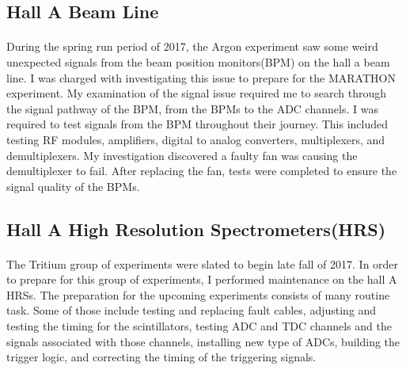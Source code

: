 \documentclass[12pt,letterpaper]{article}
\begin{document}
 \subsection*{Hall A Beam Line}
\paragraph{} During the spring run period of 2017, the Argon experiment saw some weird unexpected signals from the beam position monitors(BPM) on the hall a beam line. I was charged with investigating this issue to prepare for the MARATHON experiment. My examination of the signal issue required me to search through the signal pathway of the BPM, from the BPMs to the ADC channels. I was required to test signals from the BPM throughout their journey. This included testing RF modules, amplifiers, digital to analog converters, multiplexers, and demultiplexers. My investigation discovered a faulty fan was causing the demultiplexer to fail. After replacing the fan, tests were completed to ensure the signal quality of the BPMs. 
  
\subsection*{Hall A High Resolution Spectrometers(HRS)}
\paragraph{}The Tritium group of experiments were slated to begin late fall of 2017. In order to prepare for this group of experiments, I performed maintenance on the hall A HRSs. The preparation for the upcoming experiments consists of many routine task. Some of those include testing and replacing fault cables, adjusting and testing the timing for the scintillators, testing ADC and TDC channels and the signals associated with those channels, installing new type of ADCs, building the trigger logic, and correcting the timing of the triggering signals. 

\fi
\end{document}
